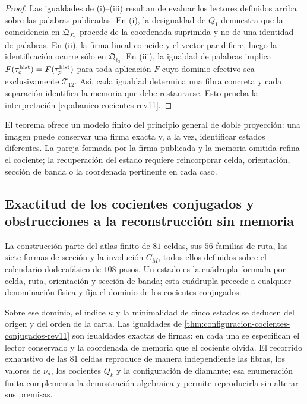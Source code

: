 \begin{proof}
Las igualdades de (i)--(iii) resultan de evaluar los lectores definidos
arriba sobre las palabras publicadas. En (i), la desigualdad de \(Q_1\)
demuestra que la coincidencia en \(\mathfrak Q_{\Sigma_7}\) procede de la
coordenada suprimida y no de una identidad de palabras. En (ii), la firma
lineal coincide y el vector par difiere, luego la identificación ocurre sólo
en \(\mathfrak Q_{\ell_3}\). En (iii), la igualdad de palabras implica
\(F(\tau_e^{\rm hist})=F(\tau_p^{\rm hist})\) para toda aplicación
\(F\) cuyo dominio efectivo sea exclusivamente \(\mathcal T_{12}\). Así,
cada igualdad determina una fibra concreta y cada separación identifica la
memoria que debe restaurarse. Esto prueba la interpretación
\eqref{eq:abanico-cocientes-rev11}.
\end{proof}

El teorema ofrece un modelo finito del principio general de doble
proyección: una imagen puede conservar una firma exacta y, a la vez,
identificar estados diferentes. La pareja formada por la firma publicada y
la memoria omitida refina el cociente; la recuperación del estado requiere
reincorporar celda, orientación, sección de banda o la coordenada pertinente
en cada caso.

\subsection{Exactitud de los cocientes conjugados y obstrucciones a la reconstrucción sin memoria}

La construcción parte del atlas finito de \(81\) celdas, sus \(56\)
familias de ruta, las siete formas de sección y la involución \(C_M\), todos
ellos definidos sobre el calendario dodecafásico de \(108\) pasos. Un estado
es la cuádrupla formada por celda, ruta, orientación y sección de banda; esta
cuádrupla precede a cualquier denominación física y fija el dominio de los
cocientes conjugados.

Sobre ese dominio, el índice \(\kappa\) y la minimalidad de cinco estados se
deducen del origen y del orden de la carta. Las igualdades de
\cref{thm:configuracion-cocientes-conjugados-rev11} son igualdades exactas de
firmas: en cada una se especifican el lector conservado y la coordenada de
memoria que el cociente olvida. El recorrido exhaustivo de las \(81\) celdas
reproduce de manera independiente las fibras, los valores de \(\nu_d\), los
cocientes \(Q_k\) y la configuración de diamante; esa enumeración finita
complementa la demostración algebraica y permite reproducirla sin alterar sus
premisas.

